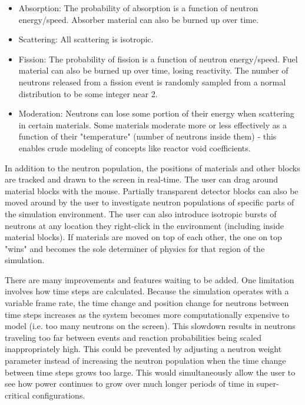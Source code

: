 \documentclass{anstrans}
\begin{document}
\begin{itemize}

    \item Absorption: The probability of absorption is a function of neutron
        energy/speed.  Absorber material can also be burned up over time.

    \item Scattering: All scattering is isotropic.

    \item Fission: The probability of fission is a function of neutron
        energy/speed.  Fuel material can also be burned up over time, losing
        reactivity.  The number of neutrons released from a fission event is
        randomly sampled from a normal distribution to be some integer near 2.

    \item Moderation: Neutrons can lose some portion of their energy when
        scattering in certain materials. Some materials moderate more or less
        effectively as a function of their "temperature" (number of neutrons
        inside them) - this enables crude modeling of concepts like reactor
        void coefficients.

\end{itemize}

In addition to the neutron population, the positions of materials and other
blocks are tracked and drawn to the screen in real-time.  The user can drag
around material blocks with the mouse.  Partially transparent detector blocks
can also be moved around by the user to investigate neutron populations of
specific parts of the simulation environment.  The user can also introduce
isotropic bursts of neutrons at any location they right-click in the
environment (including inside material blocks).  If materials are moved on top
of each other, the one on top "wins" and becomes the sole determiner of
physics for that region of the simulation.

There are many improvements and features waiting to be added.  One limitation
involves how time steps are calculated.  Because the simulation operates with
a variable frame rate, the time change and position change for neutrons
between time steps increases as the system becomes more computationally
expensive to model (i.e. too many neutrons on the screen).  This slowdown
results in neutrons traveling too far between events and reaction
probabilities being scaled inappropriately high.  This could be prevented by
adjusting a neutron weight parameter instead of increasing the neutron
population when the time change between time steps grows too large.  This
would simultaneously allow the user to see how power continues to grow over
much longer periods of time in super-critical configurations.  
\end{document}
